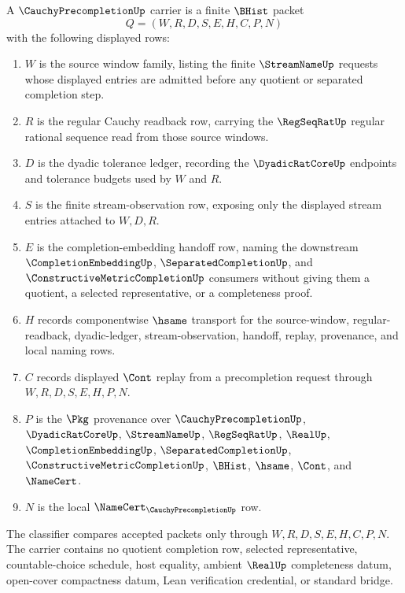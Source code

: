 \begin{definition}
\label{def:cauchy-precompletion-carrier}
A $\CauchyPrecompletionUp$ carrier is a finite $\BHist$ packet
$$
Q=(W,R,D,S,E,H,C,P,N)
$$
with the following displayed rows:
\begin{enumerate}
\item $W$ is the source window family, listing the finite $\StreamNameUp$ requests whose displayed entries are admitted before any quotient or separated completion step.
\item $R$ is the regular Cauchy readback row, carrying the $\RegSeqRatUp$ regular rational sequence read from those source windows.
\item $D$ is the dyadic tolerance ledger, recording the $\DyadicRatCoreUp$ endpoints and tolerance budgets used by $W$ and $R$.
\item $S$ is the finite stream-observation row, exposing only the displayed stream entries attached to $W,D,R$.
\item $E$ is the completion-embedding handoff row, naming the downstream $\CompletionEmbeddingUp$, $\SeparatedCompletionUp$, and $\ConstructiveMetricCompletionUp$ consumers without giving them a quotient, a selected representative, or a completeness proof.
\item $H$ records componentwise $\hsame$ transport for the source-window, regular-readback, dyadic-ledger, stream-observation, handoff, replay, provenance, and local naming rows.
\item $C$ records displayed $\Cont$ replay from a precompletion request through $W,R,D,S,E,H,P,N$.
\item $P$ is the $\Pkg$ provenance over $\CauchyPrecompletionUp$, $\DyadicRatCoreUp$, $\StreamNameUp$, $\RegSeqRatUp$, $\RealUp$, $\CompletionEmbeddingUp$, $\SeparatedCompletionUp$, $\ConstructiveMetricCompletionUp$, $\BHist$, $\hsame$, $\Cont$, and $\NameCert$.
\item $N$ is the local $\NameCert_{\CauchyPrecompletionUp}$ row.
\end{enumerate}
The classifier compares accepted packets only through $W,R,D,S,E,H,C,P,N$. The carrier contains no quotient completion row, selected representative, countable-choice schedule, host equality, ambient $\RealUp$ completeness datum, open-cover compactness datum, Lean verification credential, or standard bridge.
\end{definition}

